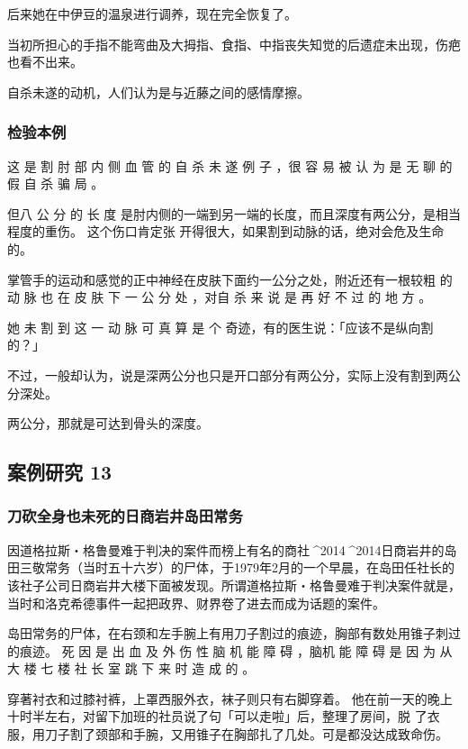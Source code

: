 \documentclass[UTF8]{ctexart}
\begin{document}
后来她在中伊豆的温泉进行调养，现在完全恢复了。

当初所担心的手指不能弯曲及大拇指、食指、中指丧失知觉的后遗症未出现，伤疤也看不出来。

自杀未遂的动机，人们认为是与近藤之间的感情摩擦。

\subsubsection*{检验本例}

这 是 割 肘 部 内 侧 血 管 的 自 杀 未 遂 例 子 ，很 容 易 被 认 为 是 无 聊 的 假 自 杀 骗 局 。

但八 公 分 的 长 度 是肘内侧的一端到另一端的长度，而且深度有两公分，是相当程度的重伤。
这个伤口肯定张 开得很大，如果割到动脉的话，绝对会危及生命的。 

掌管手的运动和感觉的正中神经在皮肤下面约一公分之处，附近还有一根较粗 的 动 脉 也 在 皮 肤 下 一 公 分 处 ，对自 杀 来 说 是 再 好 不 过 的 地 方 。

她 未 割 到 这 一 动 脉 可 真 算 是 个 奇迹，有的医生说：「应该不是纵向割的？」

不过，一般却认为，说是深两公分也只是开口部分有两公分，实际上没有割到两公分深处。

两公分，那就是可达到骨头的深度。

\subsection{案例研究 13}
\subsubsection*{刀砍全身也未死的日商岩井岛田常务}

因道格拉斯‧格鲁曼难于判决的案件而榜上有名的商社^^^^2014^^^^2014日商岩井的岛田三敬常务（当时五十六岁）的尸体，于1979年2月的一个早晨，在岛田任社长的该社子公司日商岩井大楼下面被发现。所谓道格拉斯‧格鲁曼难于判决案件就是，当时和洛克希德事件一起把政界、财界卷了进去而成为话题的案件。

岛田常务的尸体，在右颈和左手腕上有用刀子割过的痕迹，胸部有数处用锥子刺过的痕迹。 
死 因 是 出 血 及 外 伤 性 脑 机 能 障 碍 ，脑机 能 障 碍 是 因 为 从 大 楼 七 楼 社 长 室 跳 下 来 时 造 成 的 。

穿著衬衣和过膝衬裤，上罩西服外衣，袜子则只有右脚穿着。 
他在前一天的晚上十时半左右，对留下加班的社员说了句「可以走啦」后，整理了房间，脱 了衣服，用刀子割了颈部和手腕，又用锥子在胸部扎了几处。可是都没达成致命伤。
\end{document}

